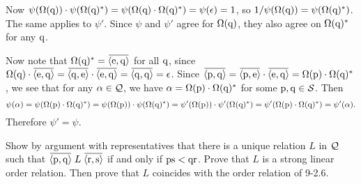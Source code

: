 \begin{solution}
Now $\psi(\Omega(\mathrm{q}))\cdot\psi(\Omega(\mathrm{q})^{\ast})
=\psi(\Omega(\mathrm{q})\cdot \Omega(\mathrm{q})^{\ast})=\psi(\epsilon)=1$, so
$1/\psi(\Omega(\mathrm{q})) = \psi(\Omega(\mathrm{q})^{\ast})$. The same applies to $\psi'$.
Since $\psi$ and $\psi'$ agree for $\Omega(\mathrm{q})$, they also agree on $\Omega(\mathrm{q})^{\ast}$
for any $\mathrm{q}$.

Now note that $\Omega(\mrm q)^{\ast}=\overbar{\aprn{\mrm e,\mrm q}}$ for all $\mathrm{q}$,
since $\Omega(\mrm q)\cdot \overbar{\aprn{\mrm e,\mrm q}}
=\overbar{\aprn{\mrm q,\mrm e}}\cdot \overbar{\aprn{\mrm e,\mrm q}}
=\overbar{\aprn{\mrm q,\mrm q}}=\eps$.
Since $\overbar{\aprn{\mrm p,\mrm q}}=\overbar{\aprn{\mrm p,\mrm e}}\cdot \overbar{\aprn{\mrm e,\mrm q}}
=\Omega(\mrm p)\cdot \Omega(\mrm q)^{\ast}$, we see that for any $\alpha\in\mathcal{Q}$, we have
$\alpha=\Omega(\mathrm{p})\cdot \Omega(\mathrm{q})^{\ast}$ for some $\mathrm{p},\mathrm{q}\in\mathcal{S}$.
Then
\[\psi(\alpha)=\psi(\Omega(\mathrm{p})\cdot \Omega(\mathrm{q})^{\ast})
=\psi(\Omega(\mathrm{p}))\cdot \psi(\Omega(\mathrm{q})^{\ast})
=\psi'(\Omega(\mathrm{p}))\cdot \psi'(\Omega(\mathrm{q})^{\ast})
=\psi'(\Omega(\mathrm{p})\cdot \Omega(\mathrm{q})^{\ast})=\psi'(\alpha).\]
Therefore $\psi'=\psi$.
\end{solution}

\begin{exercise}
Show by argument with representatives that there is a unique relation $L$ in $\mathcal{Q}$ such
that $\overbar{\aprn{\mrm p,\mrm q}}\mathrel L \overbar{\aprn{\mrm r,\mrm s}}$
if and only if $\mathrm{ps} < \mathrm{qr}$. Prove that $L$ is a strong linear order relation.
Then prove that $L$ coincides with the order relation of 9-2.6.
\end{exercise}


